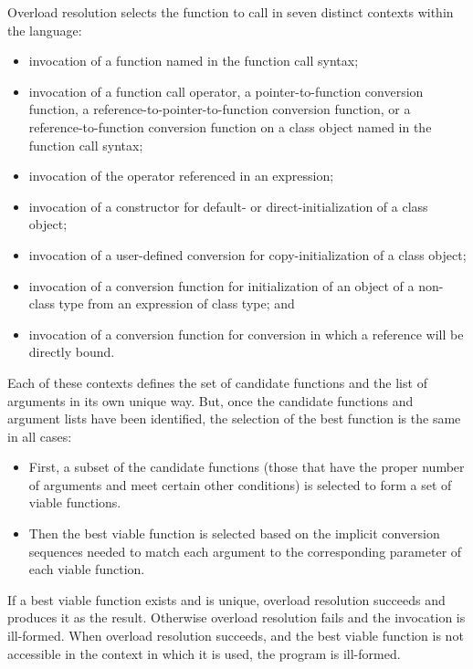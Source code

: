 \pnum
{}%
Overload resolution selects the function to call in seven distinct
contexts within the language:
\begin{itemize}
\item
invocation of a function named in the function call syntax;
\item
invocation of a function call operator, a pointer-to-function
conversion function, a reference-to-pointer-to-function conversion
function, or a reference-to-function
conversion function on a class object named in the function
call syntax;
\item
invocation of the operator referenced in an expression;
\item
invocation of a constructor for default- or direct-initialization
of a class object;
\item
invocation of a user-defined conversion for
copy-initialization of a class object;
\item
invocation of a conversion function for initialization of an object of a
non-class type from an expression of class type; and
\item
invocation of a conversion function for conversion
in which a reference
will be directly bound.
\end{itemize}

Each of these contexts defines the set of candidate functions and
the list of arguments in its own unique way.
But, once the
candidate functions and argument lists have been identified, the
selection of the best function is the same in all cases:

\begin{itemize}
\item
First, a subset of the candidate functions (those that have
the proper number of arguments and meet certain other
conditions) is selected to form a set of
%
viable functions.
\item
Then the best viable function is selected based on the
implicit conversion sequences needed to
match each argument to the corresponding parameter of each
viable function.
\end{itemize}

\pnum
If a best viable function exists and is unique, overload
resolution succeeds and produces it as the result.
Otherwise
overload resolution fails and the invocation is ill-formed.
When overload resolution succeeds,
and the best viable function is not accessible in the context
in which it is used,
the program is ill-formed.

